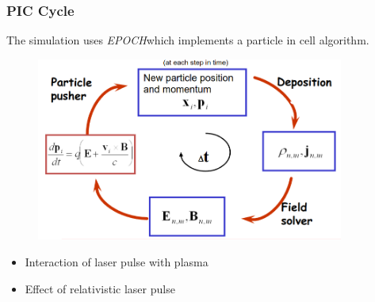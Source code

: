 \documentclass{beamer}
\begin{document}
\begin{frame}
    \frametitle{PIC Cycle}
    \small
    The simulation uses \textit{EPOCH}\footnotemark  which implements a particle in cell algorithm.
    \begin{figure}
        \centering
        \includegraphics[width=0.9\textwidth, height=0.60\textheight]{images/PIC.png}
        \label{fig:pic}
    \end{figure}
    \begin{itemize}
        \item Interaction of laser pulse with plasma
        \item Effect of relativistic laser pulse
    \end{itemize}
\end{frame}
\end{document}
